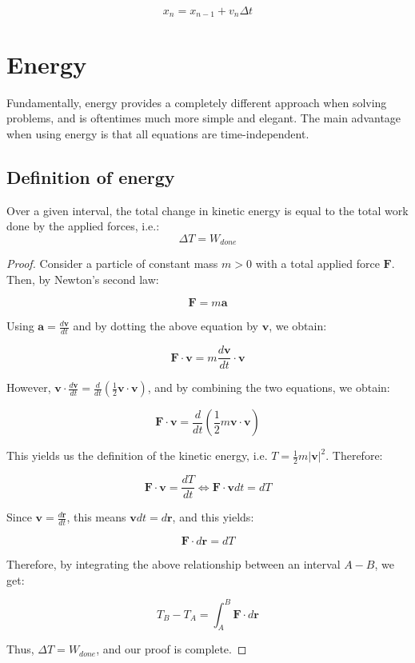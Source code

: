 \documentclass[12pt]{article}
\begin{document}
\[ x_n = x_{n - 1} + v_n \Delta t \]

\newpage

\section{Energy}

Fundamentally, energy provides a completely different approach when solving problems, and is oftentimes much more simple and elegant. The main advantage when using energy is that all equations are time-independent.

\subsection{Definition of energy}

\begin{theorem}
    Over a given interval, the total change in kinetic energy is equal to the total work done by the applied forces, i.e.:
    \[ \Delta T = W_{done} \]
\end{theorem}

\begin{proof}
    Consider a particle of constant mass $m > 0$ with a total applied force $\mathbf{F}$. Then, by Newton's second law:

    \[ \mathbf{F} = m\mathbf{a} \]

    Using $\mathbf{a} = \frac{d\mathbf{v}}{dt}$ and by dotting the above equation by $\mathbf{v}$, we obtain:

    \[ \mathbf{F} \cdot \mathbf{v} = m \frac{d\mathbf{v}}{dt} \cdot \mathbf{v} \]

    However, $\mathbf{v} \cdot \frac{d\mathbf{v}}{dt} = \frac{d}{dt}\left(\frac{1}{2} \mathbf{v} \cdot \mathbf{v} \right)$, and by combining the two equations, we obtain:

    \[ \mathbf{F} \cdot \mathbf{v} = \frac{d}{dt}\left(\frac{1}{2}m\mathbf{v}\cdot\mathbf{v}\right) \]

    This yields us the definition of the kinetic energy, i.e. $T = \frac{1}{2}m\left|\mathbf{v}\right|^2$. Therefore:

    \[ \mathbf{F} \cdot \mathbf{v} = \frac{dT}{dt} \Leftrightarrow \mathbf{F} \cdot \mathbf{v} dt = dT \]

    Since $\mathbf{v} = \frac{d\mathbf{r}}{dt}$, this means $\mathbf{v}dt = d\mathbf{r}$, and this yields:

    \[ \mathbf{F} \cdot d\mathbf{r} = dT \]

    Therefore, by integrating the above relationship between an interval $A - B$, we get:

    \[ T_B - T_A = \int_A^B \mathbf{F} \cdot d\mathbf{r} \]

    Thus, $\Delta T = W_{done}$, and our proof is complete.
\end{proof}
\end{document}
